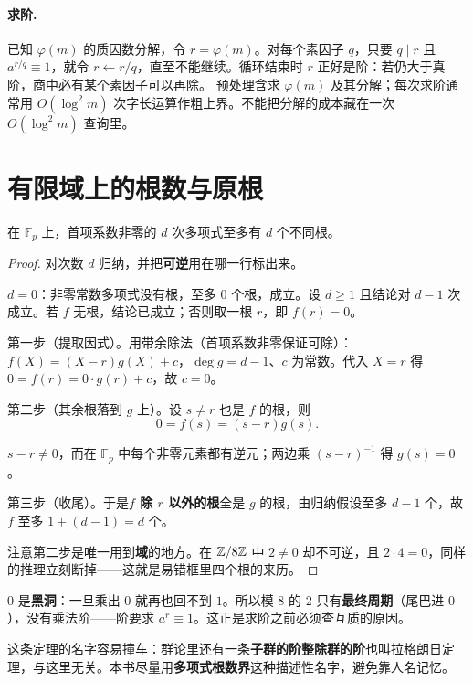 \paragraph{求阶.} 已知 $\varphi(m)$ 的质因数分解，令 $r=\varphi(m)$。对每个素因子 $q$，只要 $q\mid r$ 且 $a^{r/q}\equiv1$，就令 $r\gets r/q$，直至不能继续。循环结束时 $r$ 正好是阶：若仍大于真阶，商中必有某个素因子可以再除。
预处理含求 $\varphi(m)$ 及其分解；每次求阶通常用 $O(\log^2m)$ 次字长运算作粗上界。不能把分解的成本藏在一次 $O(\log^2m)$ 查询里。


\section{有限域上的根数与原根}
\begin{theorem}
在 $\mathbb F_p$ 上，首项系数非零的 $d$ 次多项式至多有 $d$ 个不同根。
\end{theorem}
\begin{proof}
对次数 $d$ 归纳，并把\textbf{可逆}用在哪一行标出来。

$d=0$：非零常数多项式没有根，至多 $0$ 个根，成立。设 $d\ge1$ 且结论对 $d-1$ 次成立。若 $f$ 无根，结论已成立；否则取一根 $r$，即 $f(r)=0$。

第一步（提取因式）。用带余除法（首项系数非零保证可除）：$f(X)=(X-r)g(X)+c$，$\deg g=d-1$、$c$ 为常数。代入 $X=r$ 得 $0=f(r)=0\cdot g(r)+c$，故 $c=0$。

第二步（其余根落到 $g$ 上）。设 $s\ne r$ 也是 $f$ 的根，则
\[
 0=f(s)=(s-r)g(s).
\]




$s-r\ne0$，而在 $\mathbb F_p$ 中每个非零元素都有逆元；两边乘 $(s-r)^{-1}$ 得 $g(s)=0$。

第三步（收尾）。于是\textbf{$f$ 除 $r$ 以外的根}全是 $g$ 的根，由归纳假设至多 $d-1$ 个，故 $f$ 至多 $1+(d-1)=d$ 个。

注意第二步是唯一用到\textbf{域}的地方。在 $\mathbb Z/8\mathbb Z$ 中 $2\ne0$ 却不可逆，且 $2\cdot4=0$，同样的推理立刻断掉——这就是易错框里四个根的来历。
\end{proof}

\begin{tip}[图景：$0$ 是黑洞]
$0$ 是\textbf{黑洞}：一旦乘出 $0$ 就再也回不到 $1$。所以模 $8$ 的 $2$ 只有\textbf{最终周期}（尾巴进 $0$），没有乘法阶——阶要求 $a^r\equiv1$。这正是求阶之前必须查互质的原因。
\end{tip}


\begin{tip}
这条定理的名字容易撞车：群论里还有一条\textbf{子群的阶整除群的阶}也叫拉格朗日定理，与这里无关。本书尽量用\textbf{多项式根数界}这种描述性名字，避免靠人名记忆。
\end{tip}


